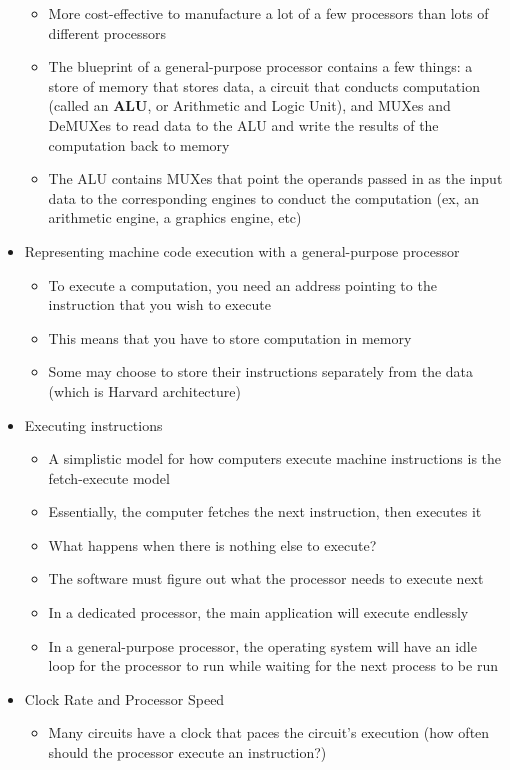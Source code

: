 \documentclass{article}
\begin{document}
\begin{itemize}
\begin{itemize}
			\item More cost-effective to manufacture a lot of a few processors than lots of different processors
			\item The blueprint of a general-purpose processor contains a few things: a store of memory that stores data, a circuit that conducts computation (called an \textbf{ALU}, or Arithmetic and Logic Unit), and MUXes and DeMUXes to read data to the ALU and write the results of the computation back to memory
			\item The ALU contains MUXes that point the operands passed in as the input data to the corresponding engines to conduct the computation (ex, an arithmetic engine, a graphics engine, etc)
		\end{itemize}
	\item Representing machine code execution with a general-purpose processor
		\begin{itemize}
			\item To execute a computation, you need an address pointing to the instruction that you wish to execute
			\item This means that you have to store computation in memory
			\item Some may choose to store their instructions separately from the data (which is Harvard architecture)
		\end{itemize}
	\item Executing instructions
		\begin{itemize}
			\item A simplistic model for how computers execute machine instructions is the fetch-execute model
			\item Essentially, the computer fetches the next instruction, then executes it
			\item What happens when there is nothing else to execute?
			\item The software must figure out what the processor needs to execute next
			\item In a dedicated processor, the main application will execute endlessly
			\item In a general-purpose processor, the operating system will have an idle loop for the processor to run while waiting for the next process to be run
		\end{itemize}
	\item Clock Rate and Processor Speed
		\begin{itemize}
			\item Many circuits have a clock that paces the circuit's execution (how often should the processor execute an instruction?)

\end{itemize}
\end{itemize}
\end{document}
